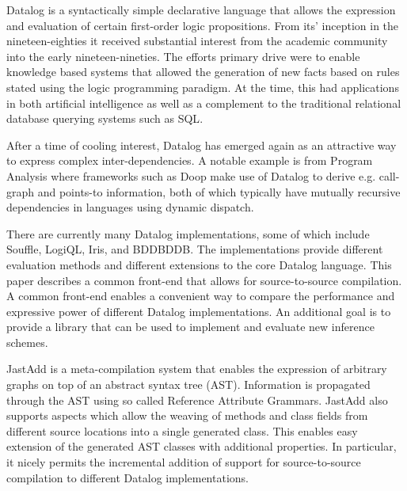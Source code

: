 Datalog is a syntactically simple declarative language that allows the expression and evaluation of certain first-order logic propositions. From its' inception in the nineteen-eighties it received substantial interest from the academic community into the early nineteen-nineties\cite{Green:2013:DRQ:2688167.2688168}. The efforts primary drive were to enable knowledge based systems that allowed the generation of new facts based on rules stated using the logic programming paradigm. At the time, this had applications in both artificial intelligence as well as a complement to the traditional relational database querying systems such as SQL\cite{Ceri:1989:YAW:627272.627357}\cite{Bancilhon:1986:AIR:16894.16859}.

After a time of cooling interest, Datalog has emerged again as an attractive way to express complex inter-dependencies\cite{Green:2013:DRQ:2688167.2688168}. A notable example is from Program Analysis where frameworks such as Doop\cite{Smaragdakis:2010:UDF:2185923.2185939} make use of Datalog to derive e.g. call-graph and points-to information, both of which typically have mutually recursive dependencies in languages using dynamic dispatch. 

There are currently many Datalog implementations, some of which include Souffle\cite{Scholz:2016:FLP:2892208.2892226}, LogiQL\cite{Aref:2015:DIL:2723372.2742796}, Iris\cite{Bishop_iris-integrated}, and BDDBDDB\cite{Whaley:2005:UDB:2099708.2099719}. The implementations provide different evaluation methods and different extensions to the core Datalog language. This paper describes a common front-end that allows for source-to-source compilation. A common front-end enables a convenient way to compare the performance and expressive power of different Datalog implementations. An additional goal is to provide a library that can be used to implement and evaluate new inference schemes.

JastAdd \cite{Ekman:2007:JEJ:1297105.1297029} is a meta-compilation system that enables the expression of arbitrary graphs on top of an abstract syntax tree (AST). Information is propagated through the AST using so called Reference Attribute Grammars. JastAdd also supports aspects which allow the weaving of methods and class fields from different source locations into a single generated class. This enables easy extension of the generated AST classes with additional properties. In particular, it nicely permits the incremental addition of support for source-to-source compilation to different Datalog implementations. 

